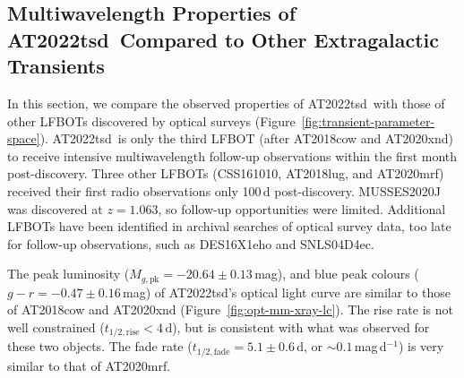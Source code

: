 \documentclass{nature_plusfigure}
\newcommand{\at}{AT2022tsd}
\begin{document}
\begin{methods}
\section{Multiwavelength Properties of \at\ Compared to Other Extragalactic Transients}
\label{sec:multiwavelength-properties}

In this section, we compare the observed properties of \at\ with those of other LFBOTs discovered by optical surveys (Figure~\ref{fig:transient-parameter-space}).
\at\ is only the third LFBOT (after AT2018cow\cite{Prentice2018,Perley2019} and AT2020xnd\cite{Perley2021}) to receive intensive multiwavelength follow-up observations within the first month post-discovery.
Three other LFBOTs (CSS161010\cite{Coppejans2020}, AT2018lug\cite{Ho2020_Koala}, and AT2020mrf\cite{Yao2022}) received their first radio observations only 100\,d post-discovery. MUSSES2020J\cite{Jiang2022} was discovered at $z=1.063$, so follow-up opportunities were limited.
Additional LFBOTs have been identified in archival searches of optical survey data, too late for follow-up observations, such as DES16X1eho\cite{Pursiainen2018} and SNLS04D4ec\cite{Arcavi2016}. 

The peak luminosity ($M_{g,\mathrm{pk}}=-20.64\pm0.13$\,mag), and blue peak colours ($g-r=-0.47\pm0.16$\,mag) of \at's optical light curve are similar to those of AT2018cow\cite{Prentice2018,Perley2019} and AT2020xnd\cite{Perley2021} (Figure~\ref{fig:opt-mm-xray-lc}).
The rise rate is not well constrained ($t_{1/2,\mathrm{rise}}<4\,$d), but is consistent with what was observed for these two objects.
The fade rate ($t_{1/2,\mathrm{fade}}=5.1\pm0.6$\,d, or $\sim0.1\,$mag\,d$^{-1}$) is very similar to that of AT2020mrf\cite{Yao2022}.



\end{methods}
\end{document}
